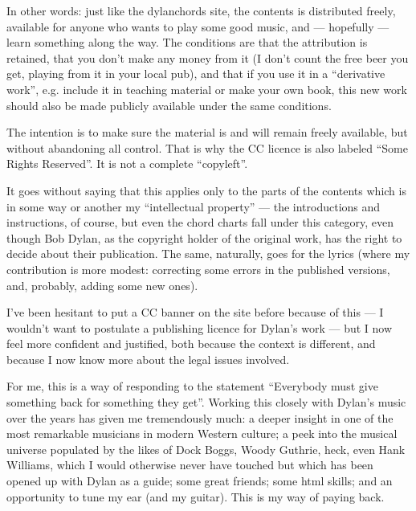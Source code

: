 \begin{articlelayout}
In other words: just like the dylanchords site, the contents is
distributed freely, available for anyone who wants to play some good
music, and --- hopefully --- learn something along the way. The
conditions are that the attribution is retained, that you don't make
any money from it (I don't count the free beer you get, playing from
it in your local pub), and that if you use it in a ``derivative
work'', e.g. include it in teaching material or make your own book,
this new work should also be made publicly available under the same
conditions.
 
The intention is to make sure the material is and will remain freely
available, but without abandoning all control. That is why the CC
licence is also labeled ``Some Rights Reserved''{}. It is not a
complete ``copyleft''{}.
 
It goes without saying that this applies only to the parts of the
contents which is in some way or another my ``intellectual property''
--- the introductions and instructions, of course, but even the chord
charts fall under this category, even though Bob Dylan, as the
copyright holder of the original work, has the right to decide about
their publication. The same, naturally, goes for the lyrics (where my
contribution is more modest: correcting some errors in the published
versions, and, probably, adding some new ones).
 
I've been hesitant to put a CC banner on the site before because of
this --- I wouldn't want to postulate a publishing licence for
Dylan's work --- but I now feel more confident and justified, both
because the context is different, and because I now know more about
the legal issues involved.
 
For me, this is a way of responding to the statement ``Everybody must
give something back for something they get''. Working this closely
with Dylan's music over the years has given me tremendously much: a
deeper insight in one of the most remarkable musicians in modern
Western culture; a peek into the musical universe populated by the
likes of Dock Boggs, Woody Guthrie, heck, even Hank Williams, which I
would otherwise never have touched but which has been opened up with
Dylan as a guide; some great friends; some html skills; and an
opportunity to tune my ear (and my guitar). This is my way of paying
back.
\end{articlelayout}
